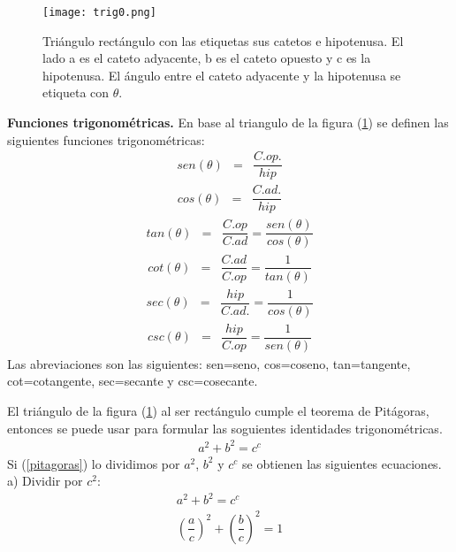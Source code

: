 \begin{center}
\begin{figure}[h!]
\centering
\texttt{[image: trig0.png]}
\caption[Triangulo rectángulo con las etiquetas sus catetos e hipotenusa]{Triángulo rectángulo con las etiquetas sus catetos e hipotenusa. El lado a es el cateto adyacente, b es el cateto opuesto y c es la hipotenusa. El ángulo entre el cateto adyacente y la hipotenusa se etiqueta con $\theta$. } \label{trig0}
\end{figure}
\end{center}

\begin{mydef}
\textbf{Funciones trigonométricas. }En base al triangulo de la figura (\ref{trig0}) se definen las siguientes funciones trigonométricas:
\begin{eqnarray}
sen(\theta)&=&\dfrac{C. op.}{hip}
\end{eqnarray}
\begin{eqnarray}
cos(\theta)&=&\dfrac{C. ad.}{hip}
\end{eqnarray}
\begin{eqnarray}
tan(\theta)&=&\dfrac{C. op}{C. ad}=\dfrac{sen(\theta)}{cos(\theta)}
\end{eqnarray}
\begin{eqnarray}
cot(\theta)&=&\dfrac{C. ad}{C. op}=\dfrac{1}{tan(\theta)}
\end{eqnarray}
\begin{eqnarray}
sec(\theta)&=&\dfrac{hip}{C. ad.}=\dfrac{1}{cos(\theta)}
\end{eqnarray}
\begin{eqnarray}
csc(\theta)&=&\dfrac{hip}{C. op}=\dfrac{1}{sen(\theta)}
\end{eqnarray}
Las abreviaciones son las siguientes: sen=seno, cos=coseno, tan=tangente, cot=cotangente, sec=secante y csc=cosecante.
\end{mydef}

El triángulo de la figura (\ref{trig0}) al ser rectángulo cumple el teorema de Pitágoras, entonces se puede usar para formular las soguientes identidades trigonométricas. 
\begin{eqnarray}
a^{2}+b^{2}=c^{c}
\label{pitagoras}
\end{eqnarray} 
Si (\ref{pitagoras}) lo dividimos por $a^{2}$, $b^{2}$ y $c^{c}$ se obtienen las siguientes ecuaciones.\\

\noindent a) Dividir por $c^{2}:$
\begin{eqnarray}
a^{2}+b^{2}=c^{c} \\
\left(\dfrac{a}{c}\right)^{2}+\left(\dfrac{b}{c}\right)^{2}=1
\end{eqnarray}

